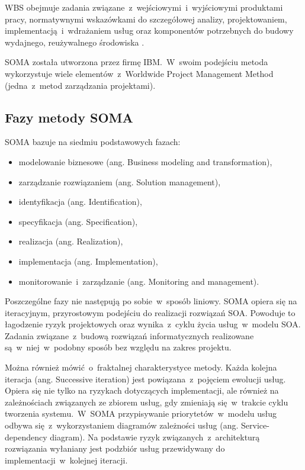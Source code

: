WBS obejmuje zadania związane~z~wejściowymi~i~wyjściowymi produktami pracy, normatywnymi wskazówkami do szczegółowej analizy, projektowaniem, implementacją~i~wdrażaniem usług oraz komponentów potrzebnych do budowy wydajnego, reużywalnego środowiska \cite{PlatIntGor}.

SOMA została utworzona przez firmę IBM.~W~swoim podejściu metoda wykorzystuje wiele elementów~z~Worldwide Project Management Method (jedna~z~metod zarządzania projektami). \cite{SOMAArsIBMJour}

\subsection{Fazy metody SOMA}
SOMA bazuje na siedmiu podstawowych fazach:
\begin{itemize}
\item{modelowanie biznesowe (ang. Business modeling and transformation),}
\item{zarządzanie rozwiązaniem (ang. Solution management),}
\item{identyfikacja (ang. Identification),}
\item{specyfikacja (ang. Specification),}
\item{realizacja (ang. Realization),}
\item{implementacja (ang. Implementation),}
\item{monitorowanie~i~zarządzanie (ang. Monitoring and management).}
\end{itemize}

Poszczególne fazy nie następują po sobie~w~sposób liniowy. SOMA opiera się na iteracyjnym, przyrostowym podejściu do realizacji rozwiązań SOA. Powoduje to łagodzenie ryzyk projektowych oraz wynika~z~cyklu życia usług~w~modelu SOA. Zadania związane~z~budową rozwiązań informatycznych realizowane są~w~niej~w~podobny sposób bez względu na zakres projektu.

Można również mówić~o~fraktalnej charakterystyce metody. Każda kolejna  iteracja (ang. Successive iteration) jest powiązana~z~pojęciem ewolucji usług. Opiera się nie tylko na ryzykach dotyczących implementacji, ale również na zależnościach związanych ze zbiorem usług, gdy zmieniają się~w~trakcie cyklu tworzenia systemu.~W~SOMA przypisywanie priorytetów~w~modelu usług odbywa się~z~wykorzystaniem diagramów zależności usług (ang. Service-dependency diagram). Na podstawie ryzyk związanych~z~architekturą rozwiązania wyłaniany jest podzbiór usług przewidywany do implementacji~w~kolejnej iteracji.

